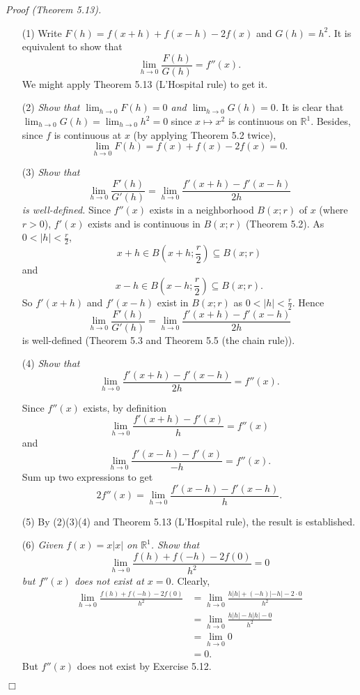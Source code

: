 \documentclass{article}
\begin{document}
\emph{Proof (Theorem 5.13).}
\begin{enumerate}
  \item[(1)]
  Write $F(h) = f(x+h) + f(x-h) - 2f(x)$ and $G(h) = h^2$.
  It is equivalent to show that
  \[
    \lim_{h \to 0}\frac{F(h)}{G(h)} = f''(x).
  \]
  We might apply Theorem 5.13 (L'Hospital rule) to get it.

  \item[(2)]
  \emph{Show that $\lim_{h \to 0} F(h) = 0$ and $\lim_{h \to 0} G(h) = 0$.}
  It is clear that $\lim_{h \to 0} G(h) = \lim_{h \to 0} h^2 = 0$
  since $x \mapsto x^2$ is continuous on $\mathbb{R}^1$.
  Besides, since $f$ is continuous at $x$ (by applying Theorem 5.2 twice),
  \[
    \lim_{h \to 0} F(h)
    = f(x) + f(x) - 2f(x)
    = 0.
  \]

  \item[(3)]
  \emph{Show that
  \[
    \lim_{h \to 0} \frac{F'(h)}{G'(h)} = \lim_{h \to 0} \frac{f'(x+h) - f'(x-h)}{2h}
  \]
  is well-defined.}
  Since $f''(x)$ exists in a neighborhood $B(x;r)$ of $x$ (where $r > 0$),
  $f'(x)$ exists and is continuous in $B(x;r)$ (Theorem 5.2).
  As $0 < |h| < \frac{r}{2}$,
  \[
    x+h \in B\left(x+h;\frac{r}{2}\right) \subseteq B(x;r)
  \]
  and
  \[
    x-h \in B\left(x-h;\frac{r}{2}\right) \subseteq B(x;r).
  \]
  So $f'(x+h)$ and $f'(x-h)$ exist in $B(x;r)$ as $0 < |h| < \frac{r}{2}$.
  Hence
  \[
    \lim_{h \to 0} \frac{F'(h)}{G'(h)}
    = \lim_{h \to 0} \frac{f'(x+h) - f'(x-h)}{2h}
  \]
  is well-defined (Theorem 5.3 and Theorem 5.5 (the chain rule)).

  \item[(4)]
  \emph{Show that
  \[
    \lim_{h \to 0} \frac{f'(x+h) - f'(x-h)}{2h} = f''(x).
  \]}

  Since $f''(x)$ exists, by definition
  \[
    \lim_{h \to 0} \frac{f'(x+h) - f'(x)}{h} = f''(x)
  \]
  and
  \[
    \lim_{h \to 0} \frac{f'(x-h) - f'(x)}{-h} = f''(x).
  \]
  Sum up two expressions to get
  \[
    2 f''(x) = \lim_{h \to 0} \frac{f'(x-h) - f'(x-h)}{h}.
  \]

  \item[(5)]
  By (2)(3)(4) and Theorem 5.13 (L'Hospital rule),
  the result is established.

  \item[(6)]
  \emph{Given $f(x) = x|x|$ on $\mathbb{R}^1$.
  Show that
  \[
    \lim_{h \to 0}{\frac{f(h) + f(-h) - 2f(0)}{h^2}} = 0
  \]
  but $f''(x)$ does not exist at $x = 0$.}
  Clearly,
  \begin{align*}
    \lim_{h \to 0}{\frac{f(h) + f(-h) - 2f(0)}{h^2}}
    &= \lim_{h \to 0}{\frac{h|h| + (-h)|-h| - 2 \cdot 0}{h^2}} \\
    &= \lim_{h \to 0}{\frac{h|h| - h|h| - 0}{h^2}} \\
    &= \lim_{h \to 0}{0} \\
    &= 0.
  \end{align*}
  But $f''(x)$ does not exist by Exercise 5.12.
\end{enumerate}
$\Box$ \\\\
\end{document}
